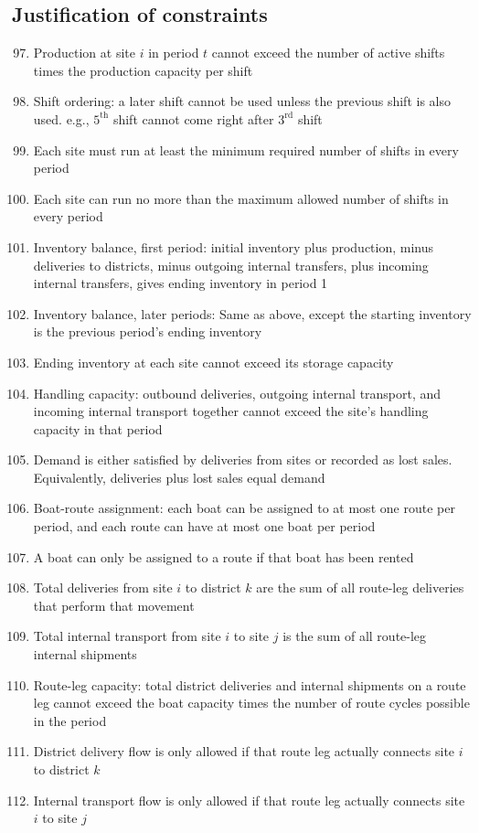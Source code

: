 \documentclass[10pt]{article}
\begin{document}
\subsection{Justification of constraints}
\begin{enumerate}
    \setcounter{enumi}{96}
    \item Production at site $i $ in period $t $ cannot exceed the number of active shifts times the production capacity per shift 
    \item Shift ordering: a later shift cannot be used unless the previous shift is also used. e.g., $5^{\text{th}}$ shift cannot come right after $3^{\text{rd}}$ shift
    \item Each site must run at least the minimum required number of shifts in every period 
    \item Each site can run no more than the maximum allowed number of shifts in every period 
    \item Inventory balance, first period: initial inventory plus production, minus deliveries to districts, minus outgoing internal transfers, plus incoming internal transfers, gives ending inventory in period 1
    \item Inventory balance, later periods: Same as above, except the starting inventory is the previous period's ending inventory
    \item Ending inventory at each site cannot exceed its storage capacity
    \item Handling capacity: outbound deliveries, outgoing internal transport, and incoming internal transport together cannot exceed the site's handling capacity in that period 
    \item Demand is either satisfied by deliveries from sites or recorded as lost sales. Equivalently, deliveries plus lost sales equal demand 
    \item Boat-route assignment: each boat can be assigned to at most one route per period, and each route can have at most one boat per period
    \item A boat can only be assigned to a route if that boat has been rented 
    \item Total deliveries from site $i $ to district $k $ are the sum of all route-leg deliveries that perform that movement
    \item Total internal transport from site $i $ to site $j $ is the sum of all route-leg internal shipments 
    \item Route-leg capacity: total district deliveries and internal shipments on a route leg cannot exceed the boat capacity times the number of route cycles possible in the period
    \item District delivery flow is only allowed if that route leg actually connects site $i $ to district $k $
    \item Internal transport flow is only allowed if that route leg actually connects site $i $ to site $j $
\end{enumerate}
\newpage 
\end{document}
